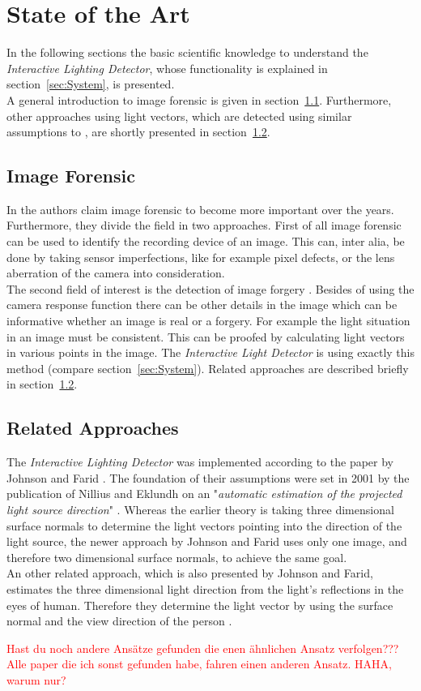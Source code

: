 \section{State of the Art} \label{sec:StateOfTheArt}
In the following sections the basic scientific knowledge to understand the \textit{Interactive Lighting Detector}, whose functionality is explained in section~\ref{sec:System}, is presented.\\
A general introduction to image forensic is given in section~\ref{sec:imageForensic}.
Furthermore, other approaches using light vectors, which are detected using similar assumptions to \cite{Johnson}, are shortly presented in section~\ref{sec:otherApproaches}.


\subsection{Image Forensic}\label{sec:imageForensic}
In \cite{4284575} the authors claim image forensic to become more important over the years. Furthermore, they divide the field in two approaches. First of all image forensic can be used to identify the recording device of an image. This can, inter alia, be done by taking sensor imperfections, like for example pixel defects, or the lens aberration of the camera into consideration. \\
The second field of interest is the detection of image forgery \cite{4806202}. Besides of using the camera response function there can be other details in the image which can be informative whether an image is real or a forgery. For example the light situation in an image must be consistent. This can be proofed by calculating light vectors in various points in the image. The \textit{Interactive Light Detector} is using exactly this method (compare section~\ref{sec:System}). Related approaches are described briefly in section~\ref{sec:otherApproaches}.


\subsection{Related Approaches} \label{sec:otherApproaches}
The \textit{Interactive Lighting Detector} was implemented according to the paper by Johnson and Farid \cite{Johnson}. The foundation of their assumptions were set in 2001 by the publication of Nillius and Eklundh on an "\textit{automatic estimation of the projected light source direction}" \cite{990650}. Whereas the earlier theory is taking three dimensional surface normals to determine the light vectors pointing into the direction of the light source, the newer approach by Johnson and Farid uses only one image, and therefore two dimensional surface normals, to achieve the same goal. \\
An other related approach, which is also presented by Johnson and Farid, estimates the three dimensional light direction from the light's reflections in the eyes of human. Therefore they determine the light vector by using the surface normal and the view direction of the person \cite{johnson06specular}.

\textcolor{red}{Hast du noch andere Ansätze gefunden die enen ähnlichen Ansatz verfolgen??? Alle paper die ich sonst gefunden habe, fahren einen anderen Ansatz. HAHA, warum nur?} 


\newpage
